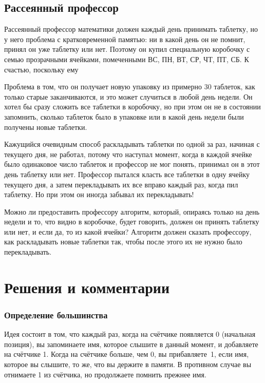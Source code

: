 \documentclass[twoside]{book}
\makeatletter
\newcommand{\rindex}[2][\imki@jobname]{%
\index[#1]{\detokenize{#2}}%
}
\makeatother
\begin{document}
\subsection*{Рассеянный профессор}%
\rindex{Рассеянный профессор}

Рассеянный профессор математики должен каждый день принимать таблетку,
но у него проблема с кратковременной памятью: ни в какой день он не
помнит, принял он уже таблетку или нет.
Поэтому он купил специальную
коробочку с семью прозрачными ячейками, помеченными ВС, ПН, ВТ, СР,
ЧТ, ПТ, СБ.
К счастью, поскольку ему


Проблема в том, что он получает новую упаковку из примерно 30
таблеток, как только старые заканчиваются, и это может случиться в
любой день недели.
Он хотел бы сразу сложить все таблетки в
коробочку, но при этом он не в состоянии запомнить, сколько таблеток
было в упаковке или в какой день недели были получены новые таблетки.

Кажущийся очевидным способ раскладывать таблетки по одной за раз, начиная с текущего дня, не работал, потому что наступал момент, когда в каждой ячейке было одинаковое число таблеток и профессор не мог понять, принимал он в этот день таблетку или нет.
Профессор пытался класть все таблетки в одну ячейку текущего дня, а затем перекладывать их все вправо каждый раз, когда пил таблетку.
Но при этом он иногда забывал их перекладывать!

Можно ли предоставить профессору алгоритм, который, опираясь только на день недели и то, что видно в коробочке,  будет говорить, должен он принять таблетку или нет, и если да, то из какой ячейки?
Алгоритм должен сказать профессору, как раскладывать новые таблетки
так, чтобы после этого их не нужно было перекладывать.



\section*{Решения и комментарии}

\subsubsection*{Определение большинства}%

Идея состоит в том, что каждый раз, когда на счётчике появляется 0
(начальная позиция), вы запоминаете имя, которое слышите в данный
момент, и добавляете на счётчике 1.
Когда на счётчике больше, чем 0,
вы прибавляете~1, если имя, которое вы слышите, то же, что вы держите
в памяти.
В противном случае вы отнимаете 1 из счётчика, но
продолжаете помнить прежнее имя.
\end{document}
